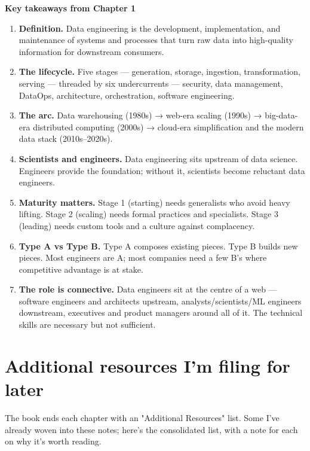 \begin{defbox}
\textbf{Key takeaways from Chapter 1}

\begin{enumerate}[leftmargin=*]
  \item \textbf{Definition.} Data engineering is the development, implementation, and maintenance of systems and processes that turn raw data into high-quality information for downstream consumers.
  \item \textbf{The lifecycle.} Five stages — generation, storage, ingestion, transformation, serving — threaded by six undercurrents — security, data management, DataOps, architecture, orchestration, software engineering.
  \item \textbf{The arc.} Data warehousing (1980s) → web-era scaling (1990s) → big-data-era distributed computing (2000s) → cloud-era simplification and the modern data stack (2010s--2020s).
  \item \textbf{Scientists and engineers.} Data engineering sits upstream of data science. Engineers provide the foundation; without it, scientists become reluctant data engineers.
  \item \textbf{Maturity matters.} Stage 1 (starting) needs generalists who avoid heavy lifting. Stage 2 (scaling) needs formal practices and specialists. Stage 3 (leading) needs custom tools and a culture against complacency.
  \item \textbf{Type A vs Type B.} Type A composes existing pieces. Type B builds new pieces. Most engineers are A; most companies need a few B's where competitive advantage is at stake.
  \item \textbf{The role is connective.} Data engineers sit at the centre of a web — software engineers and architects upstream, analysts/scientists/ML engineers downstream, executives and product managers around all of it. The technical skills are necessary but not sufficient.
\end{enumerate}
\end{defbox}

\section{Additional resources I'm filing for later}

The book ends each chapter with an "Additional Resources" list. Some I've already woven into these notes; here's the consolidated list, with a note for each on why it's worth reading.

